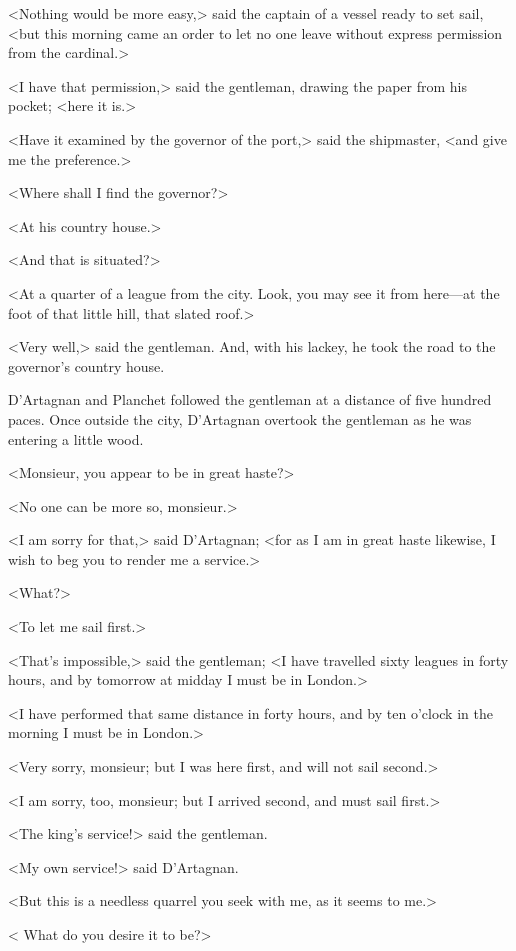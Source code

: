 <Nothing would be more easy,> said the captain of a vessel ready to set sail, <but this morning came an order to let no one leave without express permission from the cardinal.> 

<I have that permission,> said the gentleman, drawing the paper from his pocket; <here it is.> 

<Have it examined by the governor of the port,> said the shipmaster, <and give me the preference.> 

<Where shall I find the governor?> 

<At his country house.> 

<And that is situated?> 

<At a quarter of a league from the city. Look, you may see it from here—at the foot of that little hill, that slated roof.> 

<Very well,> said the gentleman. And, with his lackey, he took the road to the governor's country house. 

D'Artagnan and Planchet followed the gentleman at a distance of five hundred paces. Once outside the city, D'Artagnan overtook the gentleman as he was entering a little wood. 

<Monsieur, you appear to be in great haste?> 

<No one can be more so, monsieur.> 

<I am sorry for that,> said D'Artagnan; <for as I am in great haste likewise, I wish to beg you to render me a service.> 

<What?> 

<To let me sail first.> 

<That's impossible,> said the gentleman; <I have travelled sixty leagues in forty hours, and by tomorrow at midday I must be in London.> 

<I have performed that same distance in forty hours, and by ten o'clock in the morning I must be in London.> 

<Very sorry, monsieur; but I was here first, and will not sail second.> 

<I am sorry, too, monsieur; but I arrived second, and must sail first.> 

<The king's service!> said the gentleman. 

<My own service!> said D'Artagnan. 

<But this is a needless quarrel you seek with me, as it seems to me.> 

< What do you desire it to be?> 

